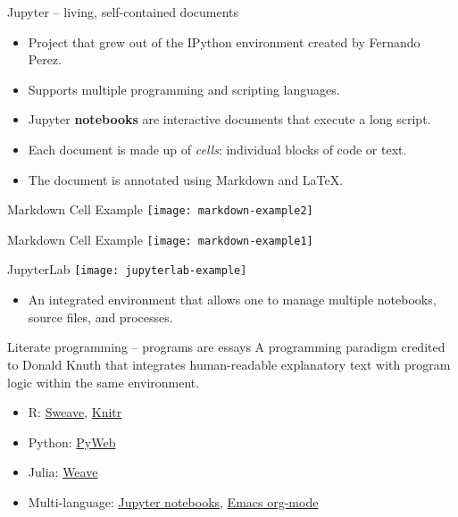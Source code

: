 \documentclass{beamer}
\begin{document}
\begin{frame}{Jupyter -- living, self-contained documents}
  \begin{itemize}
    \item Project that grew out of the IPython environment created by Fernando Perez.

    \item Supports multiple programming and scripting languages.

    \item Jupyter \textbf{notebooks} are interactive documents that execute a long script.

    \item Each document is made up of \textit{cells}: individual blocks of code or text.

    \item The document is annotated using Markdown and \LaTeX.
  \end{itemize}
\end{frame}

\begin{frame}{Markdown Cell Example}
  \center
  \texttt{[image: markdown-example2]}
\end{frame}

\begin{frame}{Markdown Cell Example}
  \center
  \texttt{[image: markdown-example1]}
\end{frame}

\begin{frame}{JupyterLab}
  \center
  \texttt{[image: jupyterlab-example]}
  \begin{itemize}
    \item An integrated environment that allows one to manage multiple notebooks, source files, and processes.
  \end{itemize}
\end{frame}

\begin{frame}{Literate programming -- programs are essays}
  A programming paradigm credited to Donald Knuth that integrates human-readable explanatory text with program logic within the same environment.

  \begin{itemize}
    \item R: \href{https://support.rstudio.com/hc/en-us/articles/200552056-Using-Sweave-and-knitr}{Sweave}, \href{https://www.r-project.org/nosvn/pandoc/knitr.html}{Knitr}
    \item Python: \href{https://github.com/simsor/PyWeb}{PyWeb}
    \item Julia: \href{https://github.com/JunoLab/Weave.jl}{Weave}
    \item Multi-language: \href{https://jupyter.org/}{Jupyter notebooks}, \href{https://orgmode.org/}{Emacs org-mode}
  \end{itemize}
\end{frame}
\end{document}
